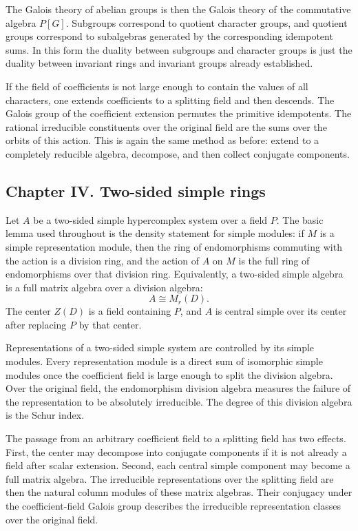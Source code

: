 \documentclass[11pt]{article}
\begin{document}
The Galois theory of abelian groups is then the Galois theory of the commutative algebra \(P[G]\). Subgroups correspond to quotient character groups, and quotient groups correspond to subalgebras generated by the corresponding idempotent sums. In this form the duality between subgroups and character groups is just the duality between invariant rings and invariant groups already established.

If the field of coefficients is not large enough to contain the values of all characters, one extends coefficients to a splitting field and then descends. The Galois group of the coefficient extension permutes the primitive idempotents. The rational irreducible constituents over the original field are the sums over the orbits of this action. This is again the same method as before: extend to a completely reducible algebra, decompose, and then collect conjugate components.

\subsection{Chapter IV. Two-sided simple rings}

Let \(A\) be a two-sided simple hypercomplex system over a field \(P\). The basic lemma used throughout is the density statement for simple modules: if \(M\) is a simple representation module, then the ring of endomorphisms commuting with the action is a division ring, and the action of \(A\) on \(M\) is the full ring of endomorphisms over that division ring. Equivalently, a two-sided simple algebra is a full matrix algebra over a division algebra:
\[
  A\cong M_r(D).
\]
The center \(Z(D)\) is a field containing \(P\), and \(A\) is central simple over its center after replacing \(P\) by that center.

Representations of a two-sided simple system are controlled by its simple modules. Every representation module is a direct sum of isomorphic simple modules once the coefficient field is large enough to split the division algebra. Over the original field, the endomorphism division algebra measures the failure of the representation to be absolutely irreducible. The degree of this division algebra is the Schur index.

The passage from an arbitrary coefficient field to a splitting field has two effects. First, the center may decompose into conjugate components if it is not already a field after scalar extension. Second, each central simple component may become a full matrix algebra. The irreducible representations over the splitting field are then the natural column modules of these matrix algebras. Their conjugacy under the coefficient-field Galois group describes the irreducible representation classes over the original field.
\end{document}
